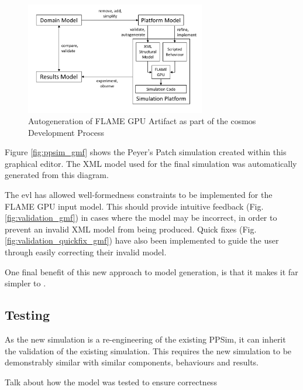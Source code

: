 \documentclass{UoYCSproject}
\begin{document}
\begin{figure}[htp]
\centering
\includegraphics[width=0.7\textwidth]{Appendix/CoSMoS_FLAME}
\caption{Autogeneration of \gls{FLAME GPU} Artifact as part of the \gls{cosmos} Development Process}
\label{fig:flame_improved}
\end{figure}

Figure \ref{fig:ppsim_gmf} shows the Peyer's Patch simulation created within this graphical editor. The XML model used for the final simulation was automatically generated from this diagram.

The \gls{evl} has allowed well-formedness constraints to be implemented for the \gls{FLAME GPU} input model.
This should provide intuitive feedback (Fig. \ref{fig:validation_gmf}) in cases where the model may be incorrect, in order to prevent an invalid XML model from being produced.
Quick fixes (Fig. \ref{fig:validation_quickfix_gmf}) have also been implemented to guide the user through easily correcting their invalid model.

One final benefit of this new approach to model generation, is that it makes it far simpler to .


\subsection{Testing}
As the new simulation is a re-engineering of the existing PPSim, it can inherit the validation of the existing simulation.
This requires the new simulation to be demonstrably similar with similar components, behaviours and results.

Talk about how the model was tested to ensure correctness\\
\end{document}
